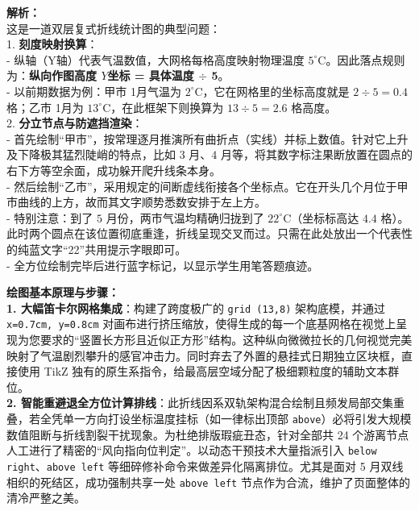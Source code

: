 \documentclass[12pt, a4paper]{ctexrep}
\begin{document}
\vspace{0.8cm}

{\small\color{gray}
\textbf{解析：}\\
这是一道双层复式折线统计图的典型问题：\\
1. \textbf{刻度映射换算}：\\
- 纵轴（Y轴）代表气温数值，大网格每格高度映射物理温度 $5^\circ$C。因此落点规则为：\textbf{纵向作图高度 $Y$坐标 = 具体温度 $\div$ 5}。\\
- 以前期数据为例：甲市 1月气温为 $2^\circ$C，它在网格里的坐标高度就是 $2 \div 5 = 0.4$ 格；乙市 1月为 $13^\circ$C，在此框架下则换算为 $13 \div 5 = 2.6$ 格高度。\\
2. \textbf{分立节点与防遮挡渲染}：\\
- 首先绘制“甲市”，按常理逐月推演所有曲折点（实线）并标上数值。针对它上升及下降极其猛烈陡峭的特点，比如 $3$ 月、$4$ 月等，将其数字标注果断放置在圆点的右下方等空余面，成功躲开爬升线条本身。\\
- 然后绘制“乙市”，采用规定的间断虚线衔接各个坐标点。它在开头几个月位于甲市曲线的上方，故而其文字顺势悉数安排于左上方。\\
- 特别注意：到了 $5$ 月份，两市气温均精确归拢到了 $22^\circ$C（坐标标高达 $4.4$ 格）。此时两个圆点在该位置彻底重逢，折线呈现交叉而过。只需在此处放出一个代表性的纯蓝文字“22”共用提示字眼即可。\\
- 全方位绘制完毕后进行蓝字标记，以显示学生用笔答题痕迹。
}

\vspace{0.6cm}

{\small\color{blue!70!black}
\textbf{绘图基本原理与步骤：}\\
\textbf{1. 大幅笛卡尔网格集成}：构建了跨度极广的 \texttt{grid (13,8)} 架构底模，并通过 \texttt{x=0.7cm, y=0.8cm} 对画布进行挤压缩放，使得生成的每一个底基网格在视觉上呈现为您要求的“竖置长方形且近似正方形”结构。这种纵向微微拉长的几何视觉完美映射了气温剧烈攀升的感官冲击力。同时弃去了外置的悬挂式日期独立区块框，直接使用 TikZ 独有的原生系指令，给最高层空域分配了极细颗粒度的辅助文本群位。\\
\textbf{2. 智能重避退全方位计算排线}：此折线因系双轨架构混合绘制且频发局部交集重叠，若全凭单一方向打设坐标温度挂标（如一律标出顶部 \texttt{above}）必将引发大规模数值阻断与折线割裂干扰现象。为杜绝排版瑕疵丑态，针对全部共 24 个游离节点人工进行了精密的“风向指向位判定”。以动态干预技术大量指派引入 \texttt{below right}、\texttt{above left} 等细碎修补命令来做差异化隔离排位。尤其是面对 5 月双线相织的死结区，成功强制共享一处 \texttt{above left} 节点作为合流，维护了页面整体的清冷严整之美。
}
\end{document}
